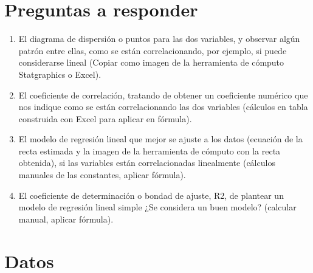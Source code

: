 \documentclass[conference]{IEEEtran}
\begin{document}
\section{Preguntas a responder}

\begin{enumerate}
	\item El diagrama de dispersión o puntos para las dos variables, y observar algún patrón entre
	      ellas, como se están correlacionando, por ejemplo, si puede considerarse lineal (Copiar
	      como imagen de la herramienta de cómputo Statgraphics o Excel).

	\item El coeficiente de correlación, tratando de obtener un coeficiente numérico que nos
	      indique como se están correlacionando las dos variables (cálculos en tabla construida
	      con Excel para aplicar en fórmula).

	\item El modelo de regresión lineal que mejor se ajuste a los datos (ecuación de la recta
	      estimada y la imagen de la herramienta de cómputo con la recta obtenida), si las
	      variables están correlacionadas linealmente (cálculos manuales de las constantes,
	      aplicar fórmula).

	\item El coeficiente de determinación o bondad de ajuste, R2, de plantear un modelo de
	      regresión lineal simple ¿Se considera un buen modelo? (calcular manual, aplicar
	      fórmula).
\end{enumerate}

\section{Datos}
\end{document}
